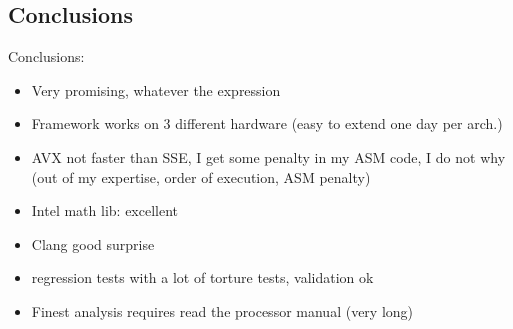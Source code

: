 \documentclass{beamer}
\begin{document}
%
%


\subsection*{Conclusions}
\begin{frame}[fragile]
Conclusions:
\begin{itemize}
\item Very promising, whatever the expression
\item Framework works on 3 different hardware (easy to extend one day per arch.)
\item AVX not faster than SSE, I get some penalty in my ASM code, I do not why (out of my expertise, order of execution, ASM penalty)
\item Intel math lib: excellent
\item Clang good surprise
\item regression tests with a lot of torture tests, validation ok
\item Finest analysis requires read the processor manual (very long)
\end{itemize}

\end{frame}
\end{document}

